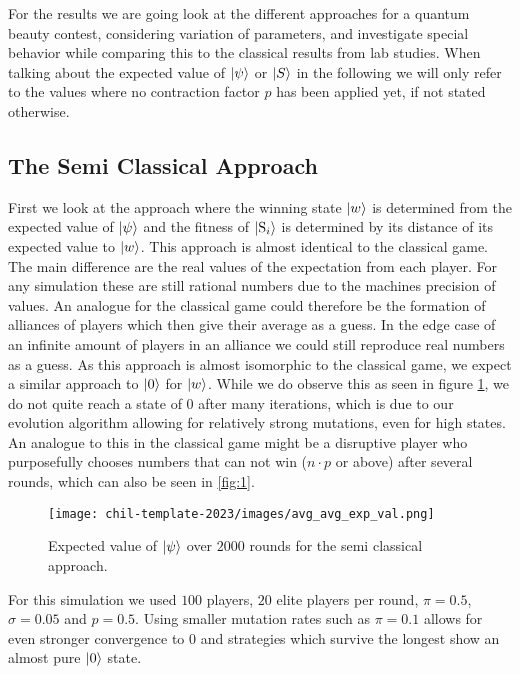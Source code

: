 For the results we are going look at the different approaches for a quantum beauty contest, considering variation of parameters, and investigate special behavior while comparing this to the classical results from lab studies. When talking about the expected value of $\ket{\psi}$ or $\ket{S}$ in the following we will only refer to the values where no contraction factor $p$ has been applied yet, if not stated otherwise.\\

\subsection{The Semi Classical Approach}
\label{sub: The semi classical approach}

First we look at the approach where the winning state $\ket{w}$ is determined from the expected value of $\ket{\psi}$ and the fitness of $\ket{\text{S}_i}$ is determined by its distance of its expected value to $\ket{w}$. This approach is almost identical to the classical game. The main difference are the real values of the expectation from each player. For any simulation these are still rational numbers due to the machines precision of values. An analogue for the classical game could therefore be the formation of alliances of players which then give their average as a guess. In the edge case of an infinite amount of players in an alliance we could still reproduce real numbers as a guess. As this approach is almost isomorphic to the classical game, we expect a similar approach to $\ket{0}$ for $\ket{w}$. While we do observe this as seen in figure \ref{fig:avg_avg_exp_val}, we do not quite reach a state of 0 after many iterations, which is due to our evolution algorithm allowing for relatively strong mutations, even for high states. An analogue to this in the classical game might be a disruptive player who purposefully chooses numbers that can not win ($n\cdot p$ or above) after several rounds, which can also be seen in \ref{fig:1}.

\begin{figure}[h]
    \centering
    \texttt{[image: chil-template-2023/images/avg\_avg\_exp\_val.png]}
    \caption{Expected value of $\ket{\psi}$ over $2000$ rounds for the semi classical approach.}
    \label{fig:avg_avg_exp_val}
\end{figure}

For this simulation we used $100$ players, $20$ elite players per round, $\pi = 0.5$, $\sigma = 0.05$ and $p = 0.5$. Using smaller mutation rates such as $\pi = 0.1$ allows for even stronger convergence to 0 and strategies which survive the longest show an almost pure $\ket{0}$ state.\\

